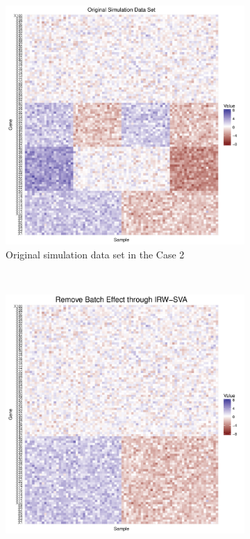 \documentclass[11pt]{article}
\begin{document}
\begin{figure}[h!]
    \centering
    \begin{subfigure}[b]{0.3\textwidth}
        \centering
        \includegraphics[width = \textwidth]{figures/simulate2.pdf}
        \caption{Original simulation data set in the Case 2}
    \end{subfigure}%
~
    \begin{subfigure}[b]{0.3\textwidth}
        \centering
        \includegraphics[width = \textwidth]{figures/sva2.pdf}

\end{subfigure}
\end{figure}
\end{document}
